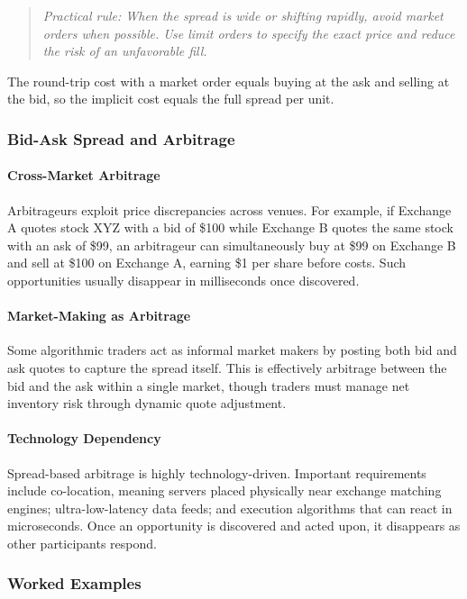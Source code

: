 \documentclass[12pt,openany]{book}
\begin{document}
\begin{quote}
\textit{Practical rule: When the spread is wide or shifting rapidly, avoid market orders when possible. Use limit orders to specify the exact price and reduce the risk of an unfavorable fill.}
\end{quote}

The round-trip cost with a market order equals buying at the ask and selling at the bid, so the implicit cost equals the full spread per unit.

\subsubsection{Bid-Ask Spread and Arbitrage}
\paragraph{Cross-Market Arbitrage}
Arbitrageurs exploit price discrepancies across venues. For example, if Exchange A quotes stock XYZ with a bid of \$100 while Exchange B quotes the same stock with an ask of \$99, an arbitrageur can simultaneously buy at \$99 on Exchange B and sell at \$100 on Exchange A, earning \$1 per share before costs. Such opportunities usually disappear in milliseconds once discovered.

\paragraph{Market-Making as Arbitrage}
Some algorithmic traders act as informal market makers by posting both bid and ask quotes to capture the spread itself. This is effectively arbitrage between the bid and the ask within a single market, though traders must manage net inventory risk through dynamic quote adjustment.

\paragraph{Technology Dependency}
Spread-based arbitrage is highly technology-driven. Important requirements include co-location, meaning servers placed physically near exchange matching engines; ultra-low-latency data feeds; and execution algorithms that can react in microseconds. Once an opportunity is discovered and acted upon, it disappears as other participants respond.

\subsubsection{Worked Examples}
\end{document}

